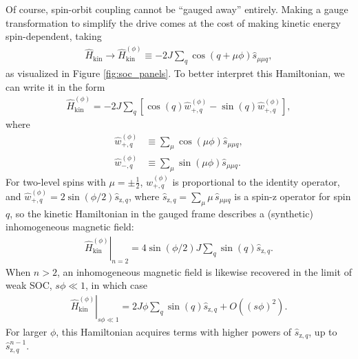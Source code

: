 \documentclass[aps,pra,nofootinbib,twocolumn,superscriptaddress]{revtex4-2}
\renewcommand{\t}{\text} %
\newcommand{\p}[1]{\left(#1\right)} %
\renewcommand{\sp}[1]{\left[#1\right]} %
\newcommand{\1}{\mathds{1}}
\newcommand{\s}{\hat s}
\renewcommand{\H}{\hat H}
\newcommand{\z}{\text{z}}
\begin{document}
Of course, spin-orbit coupling cannot be ``gauged away'' entirely.
Making a gauge transformation to simplify the drive comes at the cost of making kinetic energy spin-dependent, taking
\begin{align}
  \H_{\t{kin}} \to \H_{\t{kin}}^{(\phi)}
  \equiv -2J \sum_q \cos\p{q+\mu\phi} \s_{\mu\mu q},
\end{align}
as visualized in Figure \ref{fig:soc_panels}.
To better interpret this Hamiltonian, we can write it in the form
\begin{align}
  \H_{\t{kin}}^{(\phi)}
  = -2J \sum_q
  \sp{\cos\p{q} \hat w_{+,q}^{(\phi)} - \sin\p{q} \hat w_{+,q}^{(\phi)}},
\end{align}
where
\begin{align}
  \hat w_{+,q}^{(\phi)} &\equiv \sum_\mu \cos\p{\mu\phi} \s_{\mu\mu q}, \\
  \hat w_{-,q}^{(\phi)} &\equiv \sum_\mu \sin\p{\mu\phi} \s_{\mu\mu q}.
\end{align}
For two-level spins with $\mu=\pm\frac12$, $\hat w_{+,q}^{(\phi)}$ is proportional to the identity operator, and $\hat w_{+,q}^{(\phi)}=2\sin\p{\phi/2} \s_{\z,q}$, where $\s_{\z,q}=\sum_\mu \mu\, \s_{\mu\mu q}$ is a spin-z operator for spin $q$, so the kinetic Hamiltonian in the gauged frame describes a (synthetic) inhomogeneous magnetic field:
\begin{align}
  \left. \H_{\t{kin}}^{(\phi)} \right|_{n=2}
  = 4\sin\p{\phi/2} J \sum_q \sin\p{q} \s_{\z,q}.
\end{align}
When $n>2$, an inhomogeneous magnetic field is likewise recovered in the limit of weak SOC, $s\phi\ll1$, in which case
\begin{align}
  \left. \H_{\t{kin}}^{(\phi)} \right|_{s\phi\ll1}
  = 2J\phi \sum_q \sin\p{q} \s_{\z,q} + O\p{(s\phi)^2}.
\end{align}
For larger $\phi$, this Hamiltonian acquires terms with higher powers of $\s_{\z,q}$, up to $\s_{\z,q}^{n-1}$.
\end{document}
